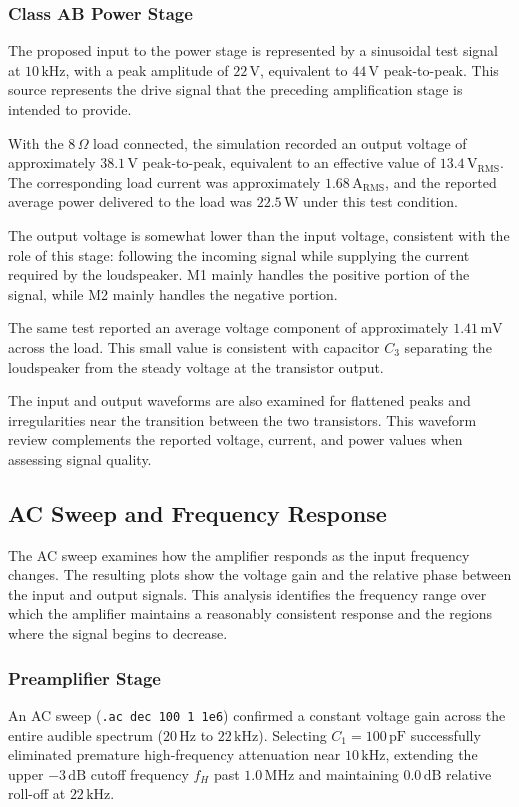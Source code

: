 \documentclass[conference]{IEEEtran}
\begin{document}
\subsubsection{Class AB Power Stage}
The proposed input to the power stage is represented by a sinusoidal test signal at $10\,\mathrm{kHz}$, with a peak amplitude of $22\,\mathrm{V}$, equivalent to $44\,\mathrm{V}$ peak-to-peak. This source represents the drive signal that the preceding amplification stage is intended to provide.

With the $8\,\Omega$ load connected, the simulation recorded an output voltage of approximately $38.1\,\mathrm{V}$ peak-to-peak, equivalent to an effective value of $13.4\,\mathrm{V_{RMS}}$. The corresponding load current was approximately $1.68\,\mathrm{A_{RMS}}$, and the reported average power delivered to the load was $22.5\,\mathrm{W}$ under this test condition.

The output voltage is somewhat lower than the input voltage, consistent with the role of this stage: following the incoming signal while supplying the current required by the loudspeaker. M1 mainly handles the positive portion of the signal, while M2 mainly handles the negative portion.

The same test reported an average voltage component of approximately $1.41\,\mathrm{mV}$ across the load. This small value is consistent with capacitor $C_3$ separating the loudspeaker from the steady voltage at the transistor output.

The input and output waveforms are also examined for flattened peaks and irregularities near the transition between the two transistors. This waveform review complements the reported voltage, current, and power values when assessing signal quality.

\subsection{AC Sweep and Frequency Response}
The AC sweep examines how the amplifier responds as the input frequency changes. The resulting plots show the voltage gain and the relative phase between the input and output signals. This analysis identifies the frequency range over which the amplifier maintains a reasonably consistent response and the regions where the signal begins to decrease.

\subsubsection{Preamplifier Stage}
An AC sweep (\texttt{.ac dec 100 1 1e6}) confirmed a constant voltage gain across the entire audible spectrum ($20\,\mathrm{Hz}$ to $22\,\mathrm{kHz}$). Selecting $C_1 = 100\,\mathrm{pF}$ successfully eliminated premature high-frequency attenuation near $10\,\mathrm{kHz}$, extending the upper $-3\,\mathrm{dB}$ cutoff frequency $f_H$ past $1.0\,\mathrm{MHz}$ and maintaining $0.0\,\mathrm{dB}$ relative roll-off at $22\,\mathrm{kHz}$.
\end{document}
